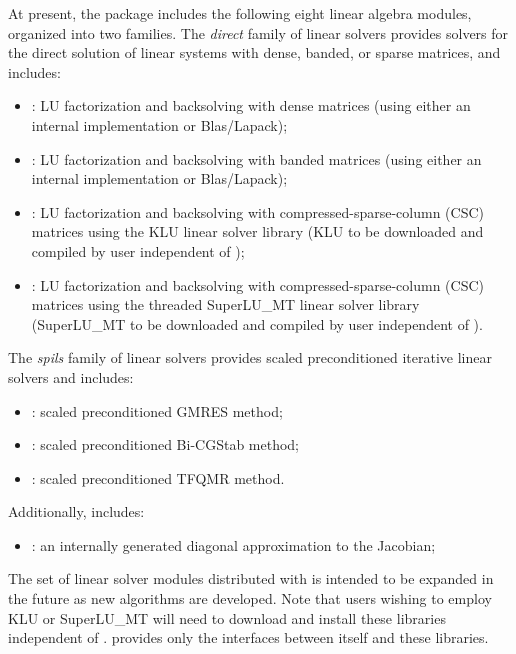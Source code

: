 At present, the package includes the following eight {\cvode} linear algebra
modules, organized into two families. The {\em direct} family of linear
solvers provides solvers for the direct solution of linear systems with
dense, banded, or sparse matrices, and includes:
\begin{itemize} 
\item {\cvdense}: LU factorization and backsolving with dense matrices
  (using either an internal implementation or Blas/Lapack); 
\item {\cvband}: LU factorization and backsolving with banded matrices
  (using either an internal implementation or Blas/Lapack); 
\item {\cvklu}: LU factorization and backsolving with
  compressed-sparse-column (CSC) matrices using the KLU linear solver
  library \cite{DaPa:10,KLU_site} (KLU to be downloaded and compiled by user independent 
  of {\cvode});
\item {\cvsuperlumt}: LU factorization and backsolving with
  compressed-sparse-column (CSC) matrices using the threaded
  SuperLU\_MT linear solver library \cite{Li:05,DGL:99,SuperLUMT_site} 
  (SuperLU\_MT to be downloaded and compiled by user independent 
  of {\cvode}).
\end{itemize}
The {\em spils} family of linear solvers provides scaled preconditioned
iterative linear solvers and includes:
\begin{itemize} 
\item {\cvspgmr}: scaled preconditioned GMRES method;
\item {\cvspbcg}: scaled preconditioned Bi-CGStab method;
\item {\cvsptfqmr}: scaled preconditioned TFQMR method.
\end{itemize}
Additionally, {\cvode} includes:
\begin{itemize}
\item {\cvdiag}: an internally generated diagonal approximation to the 
  Jacobian; 
\end{itemize}
The set of linear solver modules distributed with {\cvode} is intended to be expanded in the
future as new algorithms are developed.
Note that users wishing to employ KLU or 
SuperLU\_MT will need to download and install these libraries independent of {\sundials}.
{\sundials} provides only the interfaces between itself and these libraries.

